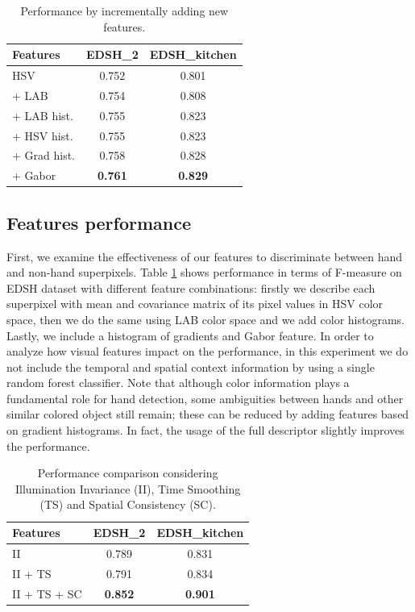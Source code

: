  \begin{table}
 \centering
 \begin{tabular}{|l|c|c|}
 \hline
 \textbf{Features} 	& \textbf{EDSH\_2} & \textbf{EDSH\_{kitchen}}	\\ \hline\hline
 HSV	& 0.752 & 0.801		\\ \hline
 + LAB	& 0.754	&	0.808 \\ \hline
 + LAB hist.	& 0.755 & 0.823			\\ \hline  
 + HSV hist. & 0.755 & 0.823			\\ \hline  
 + Grad hist. & 0.758	&	0.828	\\ \hline  
 + Gabor & 	\textbf{0.761}	& \textbf{0.829} \\ \hline  
 \end{tabular}
 \caption{Performance by incrementally adding new features.}\label{tab:localfeatures}
 \end{table}

\subsection{Features performance}

First, we examine the effectiveness of our features to discriminate between hand and non-hand superpixels. 
Table \ref{tab:localfeatures} shows performance in terms of F-measure on EDSH dataset with different feature combinations: firstly we describe each superpixel with mean and covariance matrix of its pixel values in HSV color space, then we do the same using LAB color space and we add color histograms. Lastly, we include a histogram of gradients and Gabor feature.
In order to analyze how visual features impact on the performance, in this experiment we do not include the temporal and spatial context information by using a single random forest classifier.     
Note that although color information plays a fundamental role for hand detection, some ambiguities between hands and other similar colored object still remain; these can be reduced by adding features based on gradient histograms. In fact, the usage of the full descriptor slightly improves the performance.      

\begin{table}
 \centering
 \begin{tabular}{|l|c|c|}
 \hline
 \textbf{Features} 	& \textbf{EDSH\_2} & \textbf{EDSH\_{kitchen}}	\\ \hline\hline
 II	& 0.789 & 	0.831		\\ \hline
 II + TS	& 0.791	&	0.834 \\ \hline
 II + TS + SC &	\textbf{0.852} &	\textbf{0.901}	\\ \hline  
 \end{tabular}
 \caption{Performance comparison considering Illumination Invariance (II), Time Smoothing (TS) and Spatial Consistency (SC).}\label{tab:context}
\end{table}


